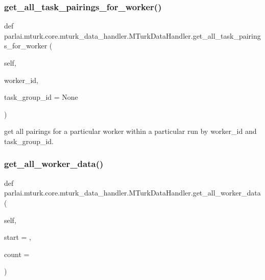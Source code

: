 \subsubsection{\texorpdfstring{get\+\_\+all\+\_\+task\+\_\+pairings\+\_\+for\+\_\+worker()}{get\_all\_task\_pairings\_for\_worker()}}
{\footnotesize\ttfamily def parlai.\+mturk.\+core.\+mturk\+\_\+data\+\_\+handler.\+M\+Turk\+Data\+Handler.\+get\+\_\+all\+\_\+task\+\_\+pairings\+\_\+for\+\_\+worker (\begin{DoxyParamCaption}\item[{}]{self,  }\item[{}]{worker\+\_\+id,  }\item[{}]{task\+\_\+group\+\_\+id = {\ttfamily None} }\end{DoxyParamCaption})}

\begin{DoxyVerb}get all pairings for a particular worker within a particular run by worker_id
and task_group_id.
\end{DoxyVerb}
 \mbox{\label{classparlai_1_1mturk_1_1core_1_1mturk__data__handler_1_1MTurkDataHandler_a188c46e50f06129a289a065809290bf3}} 
\subsubsection{\texorpdfstring{get\+\_\+all\+\_\+worker\+\_\+data()}{get\_all\_worker\_data()}}
{\footnotesize\ttfamily def parlai.\+mturk.\+core.\+mturk\+\_\+data\+\_\+handler.\+M\+Turk\+Data\+Handler.\+get\+\_\+all\+\_\+worker\+\_\+data (\begin{DoxyParamCaption}\item[{}]{self,  }\item[{}]{start = {},  }\item[{}]{count = {} }\end{DoxyParamCaption})}

